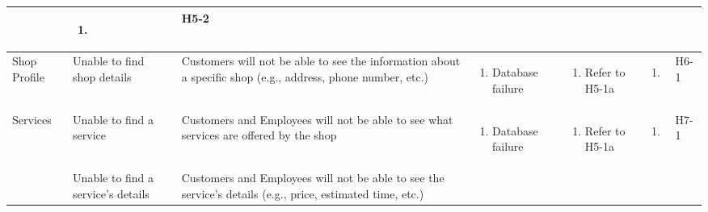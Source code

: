 \documentclass{article}
\begin{document}
\begin{landscape}
\begin{longtable}{|p{}|p{}|p{}|p{}|p{}|p{}|p{}|}
\begin{enumerate}[label=\alph*., leftmargin=*]
		   \end{enumerate}
		 & \begin{enumerate}[label=\alph*., leftmargin=*]
			   \item
		   \end{enumerate}
		 & H5-2                                                                                                        \\
		\hline
		Shop Profile
		 & Unable to find shop details
		 & Customers will not be able to see the information about a specific shop (e.g., address, phone number, etc.)
		 & \begin{enumerate}[label=\alph*., leftmargin=*]
			   \item Database failure
		   \end{enumerate}
		 & \begin{enumerate}[label=\alph*., leftmargin=*]
			   \item Refer to H5-1a
		   \end{enumerate}
		 & \begin{enumerate}[label=\alph*., leftmargin=*]
			   \item
		   \end{enumerate}
		 & H6-1                                                                                                        \\
		\hline
		\multirow{2}{*}{Services}
		 & Unable to find a service
		 & Customers and Employees will not be able to see what services are offered by the shop
		 & \begin{enumerate}[label=\alph*., leftmargin=*]
			   \item Database failure
		   \end{enumerate}
		 & \begin{enumerate}[label=\alph*., leftmargin=*]
			   \item Refer to H5-1a
		   \end{enumerate}
		 & \begin{enumerate}[label=\alph*., leftmargin=*]
			   \item
		   \end{enumerate}
		 & H7-1                                                                                                        \\
		\cline{2-7}
		~
		 & Unable to find a service's details
		 & Customers and Employees will not be able to see the service's details (e.g., price, estimated time, etc.)
		 & \begin{enumerate}[label=\alph*., leftmargin=*]

\end{enumerate}
\end{longtable}
\end{landscape}
\end{document}
